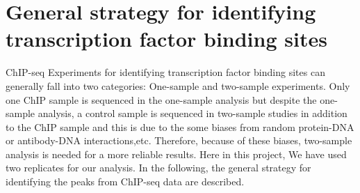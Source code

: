 \documentclass[11pt,letterpaper]{article}
\begin{document}
\section{General strategy for identifying transcription factor binding sites}
ChIP-seq Experiments for identifying transcription factor binding sites can generally fall into two categories: One-sample and two-sample experiments\cite{kim2011short}.
Only one ChIP sample is sequenced in the one-sample analysis but despite the one-sample analysis, a control sample is sequenced in two-sample studies in addition to the ChIP sample and this is due to the some biases from random protein-DNA or antibody-DNA interactions,etc.
Therefore, because of these biases, two-sample analysis is needed for a more reliable results.
Here in this project, We have used two replicates for our analysis.
In the following, the general strategy for identifying the peaks from ChIP-seq data are described.
\end{document}
